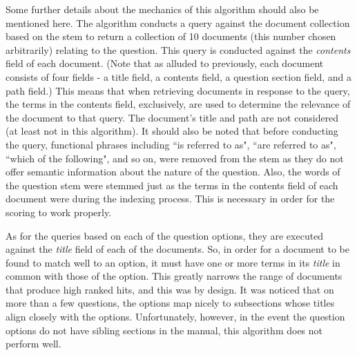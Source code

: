 Some further details about the mechanics of this algorithm should also be mentioned here.  The algorithm conducts a query against the document collection based on the stem to return a collection of 10 documents (this number chosen arbitrarily) relating to the question.  This query is conducted against the \emph{contents} field of each document.  (Note that as alluded to previously, each document consists of four fields - a title field, a contents field, a question section field, and a path field.)  This means that when retrieving documents in response to the query, the terms in the contents field, exclusively, are used to determine the relevance of the document to that query.  The document's title and path are not considered (at least not in this algorithm).  It should also be noted that before conducting the query, functional phrases including ``is referred to as", ``are referred to as", ``which of the following", and so on, were removed from the stem as they do not offer semantic information about the nature of the question.  Also, the words of the question stem were stemmed just as the terms in the contents field of each document were during the indexing process.  This is necessary in order for the scoring to work properly.  

As for the queries based on each of the question options, they are executed against the \emph{title} field of each of the documents.  So, in order for a document to be found to match well to an option, it must have one or more terms in its \emph{title} in common with those of the option.  This greatly narrows the range of documents that produce high ranked hits, and this was by design.  It was noticed that on more than a few questions, the options map nicely to subsections whose titles align closely with the options.  Unfortunately, however, in the event the question options do not have sibling sections in the manual, this algorithm does not perform well.


